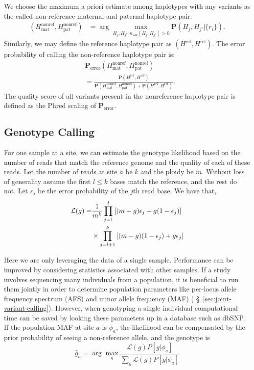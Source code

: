 \documentclass{acm_proc_article-sp}
\begin{document}
We choose the maximum a priori estimate among haplotypes with any variants
as the called non-reference maternal and paternal haplotype pair:
\begin{align}
  (H_\text{mat}^\text{nonref},H_\text{pat}^\text{nonref})&=\arg\max_{H_j,H_{j'}:n_\text{var}(H_j,H_{j'})>0}\mathbf P(H_j,H_{j'}|\{r_i\}).
\end{align}
Similarly, we may define the reference haplotype pair as
$(H^\text{ref},H^\text{ref})$.
The error probability of calling the non-reference haplotype pair is:
\begin{align}
  &\mathbf P_\text{error}(H_\text{mat}^\text{nonref},H_\text{pat}^\text{nonref}) \\ \nonumber
  &=\frac{\mathbf P(H^\text{ref},H^\text{ref})}{\mathbf P(H_\text{mat}^\text{nonref},H_\text{pat}^\text{nonref})+\mathbf P(H^\text{ref},H^\text{ref})}.
\end{align}
The quality score of all variants present in the nonreference haplotype pair
is defined as the Phred scaling of $\mathbf P_\text{error}$.

\subsection{Genotype Calling}
\label{sec:snp-calling}

For one sample at a site, we can estimate the genotype likelihood based on the number of reads that match the
reference genome and the quality of each of these reads. Let the number of reads at site $a$ be $k$ and the ploidy be $m$. Without
loss of generality assume the first $l\leq k$ bases match the reference, and the rest do not. Let $\epsilon_j$ be the
error probability of the $j$th read base. We have that,
\begin{align}
\mathcal{L}(g) =& \frac{1}{m^k} \prod_{j=1}^l \left[ (m-g)\epsilon_j + g( 1 - \epsilon_j )\right] \notag\\
&\times\prod_{j=l+1}^k \left[(m-g)(1-\epsilon_j) + g\epsilon_j \right]
\label{eq:likelihood}
\end{align}

Here we are only leveraging the data of a single sample. Performance can be improved by considering statistics associated
with other samples. If a study involves sequencing many individuals from a population, it is beneficial to run them jointly in order
to determine population parameters like per-locus allele frequency spectrum (AFS) and minor allele frequency (MAF)
( \S~\ref{sec:joint-variant-calling}). However, when genotyping a single individual computational time can be saved by looking
these parameters up in a database such as dbSNP. If the population MAF at site $a$ is $\phi_a$, the likelihood can be
compensated by the prior probability of seeing a non-reference allele, and the genotype is
\begin{equation}
\hat{g}_{a} = \arg\max_g \frac{\mathcal{L}(g)P[g|\phi_a]}{\sum_g \mathcal{L}(g)P[g|\phi_a]}
\end{equation}
\end{document}

